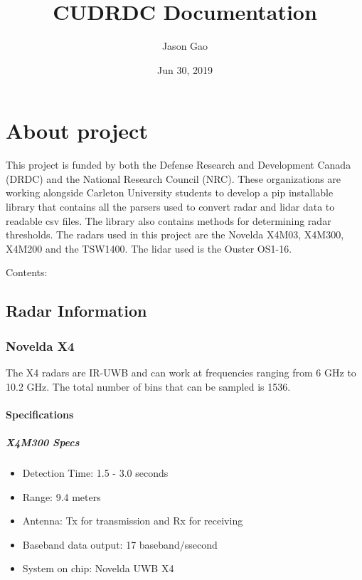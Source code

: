 \documentclass[letterpaper,10pt,english]{sphinxmanual}
\title{CUDRDC Documentation}
\date{Jun 30, 2019}
\author{Jason Gao}
\begin{document}
\pagestyle{empty}
\sphinxmaketitle
\pagestyle{plain}
\tableofcontents
\pagestyle{normal}
\label{\detokenize{index::doc}}



\chapter{About project}
\label{\detokenize{index:about-project}}
This project is funded by both the Defense Research and Development Canada (DRDC) and the National Research Council (NRC). These organizations are working alongside Carleton University students
to develop a pip installable library that contains all the parsers used to convert radar and lidar data to readable csv files. The library also contains methods for determining radar thresholds.
The radars used in this project are the Novelda X4M03, X4M300, X4M200 and the TSW1400. The lidar used is the Ouster OS1-16.

Contents:


\section{Radar Information}
\label{\detokenize{Radar information:radar-information}}\label{\detokenize{Radar information::doc}}

\subsection{Novelda X4}
\label{\detokenize{Radar information:novelda-x4}}
The X4 radars are IR-UWB and can work at frequencies ranging from 6 GHz to 10.2 GHz. The total number of bins that can be sampled is 1536.


\subsubsection{Specifications}
\label{\detokenize{Radar information:specifications}}

\paragraph{X4M300 Specs}
\label{\detokenize{Radar information:x4m300-specs}}\begin{itemize}
\item {} 
Detection Time: 1.5 - 3.0 seconds

\item {} 
Range: 9.4 meters

\item {} 
Antenna: Tx for transmission and Rx for receiving

\item {} 
Baseband data output: 17 baseband/ssecond

\item {} 
System on chip: Novelda UWB X4

\end{itemize}
\end{document}
